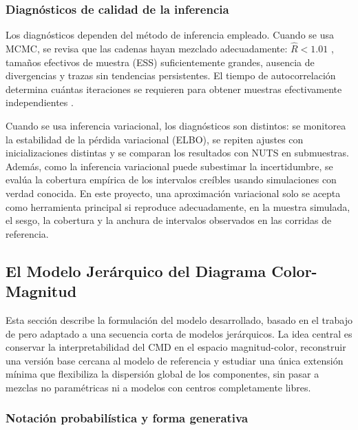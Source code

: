 \documentclass[stu, 12pt, letterpaper, donotrepeattitle, floatsintext, natbib]{apa7_ula}
\begin{document}
\subsubsection{Diagnósticos de calidad de la inferencia}
Los diagnósticos dependen del método de inferencia empleado. Cuando se
usa MCMC, se revisa que las cadenas hayan mezclado adecuadamente:
$\hat{R}<1.01$ \citep{Vehtari_Rhat_2021}, tamaños efectivos de muestra
(ESS) suficientemente grandes, ausencia de divergencias y trazas sin
tendencias persistentes. El tiempo de autocorrelación determina cuántas
iteraciones se requieren para obtener muestras efectivamente
independientes \citep{Hogg_2018}.

Cuando se usa inferencia variacional, los diagnósticos son distintos:
se monitorea la estabilidad de la pérdida variacional (ELBO), se
repiten ajustes con inicializaciones distintas y se comparan los
resultados con NUTS en submuestras. Además, como la inferencia
variacional puede subestimar la incertidumbre, se evalúa la cobertura
empírica de los intervalos creíbles usando simulaciones con verdad
conocida. En este proyecto, una aproximación variacional solo se acepta
como herramienta principal si reproduce adecuadamente, en la muestra
simulada, el sesgo, la cobertura y la anchura de intervalos observados
en las corridas de referencia.


\subsection{El Modelo Jerárquico del Diagrama Color-Magnitud}

Esta sección describe la formulación del modelo desarrollado,
basado en el trabajo de \citet{Leistedt_2017} pero
adaptado a una secuencia corta de modelos jerárquicos. La idea central
es conservar la interpretabilidad del CMD en el espacio
magnitud-color, reconstruir una versión base cercana al modelo de
referencia y estudiar una única extensión mínima que flexibiliza la
dispersión global de los componentes, sin pasar a mezclas no
paramétricas ni a modelos con centros completamente libres.

\subsubsection{Notación probabilística y forma generativa}
\end{document}
